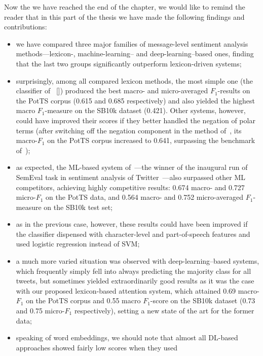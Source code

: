 \documentclass[11pt]{article}
\newcommand{\F}[0]{$F_1$}
\renewcommand{\cite}{\citep}
\begin{document}
Now the we have reached the end of the chapter, we would like to
remind the reader that in this part of the thesis we have made the
following findings and contributions:
\begin{itemize}
  \item we have compared three major families of message-level
    sentiment analysis methods---lexicon-, machine-learning-- and
    deep-learning--based ones, finding that the last two groups
    significantly outperform lexicon-driven systems;
  \item surprisingly, among all compared lexicon methods, the most
    simple one (the classifier of~\citeauthor{Hu:04}
    [\citeyear{Hu:04}]) produced the best macro- and micro-averaged
    \F{}-results on the PotTS corpus (0.615 and 0.685 respectively)
    and also yielded the highest macro \F{}-measure on the SB10k
    dataset (0.421).  Other systems, however, could have improved
    their scores if they better handled the negation of polar terms
    (after switching off the negation component in the method
    of~\citeauthor{Musto:14}, its macro-\F{} on the PotTS corpus
    increased to 0.641, surpassing the benchmark
    of~\citeauthor{Hu:04});
  \item as expected, the ML-based system of~\citet{Mohammad:13}---the
    winner of the inaugural run of SemEval task in sentiment analysis
    of Twitter~\cite{Nakov:13}---also surpassed other ML competitors,
    achieving highly competitive results: 0.674 macro- and 0.727
    micro-\F{} on the PotTS data, and 0.564 macro- and 0.752
    micro-averaged \F{}-measure on the SB10k test set;
  \item as in the previous case, however, these results could have
    been improved if the classifier dispensed with character-level and
    part-of-speech features and used logistic regression instead of
    SVM;
  \item a much more varied situation was observed with
    deep-learning--based systems, which frequently simply fell into
    always predicting the majority class for all tweets, but sometimes
    yielded extraordinarily good results as it was the case with our
    proposed lexicon-based attention system, which attained 0.69
    macro-\F{} on the PotTS corpus and 0.55 macro \F{}-score on the
    SB10k dataset (0.73 and 0.75 micro-\F{} respectively), setting a
    new state of the art for the former data;
  \item speaking of word embeddings, we should note that almost all
    DL-based approaches showed fairly low scores when they used

\end{itemize}
\end{document}
